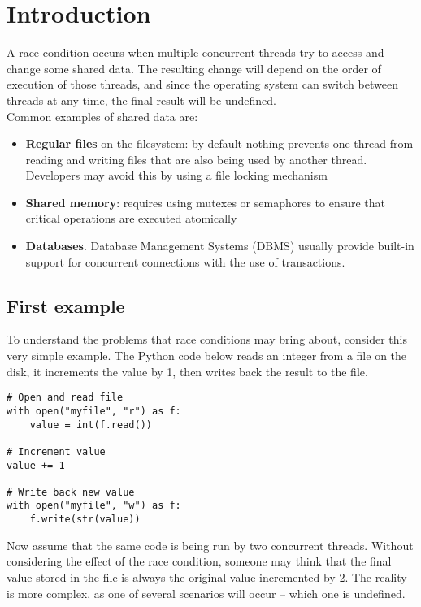 \section{Introduction}

A race condition occurs when multiple concurrent threads try to access and change some shared data. The resulting change will depend on the order of execution of those threads, and since the operating system can switch between threads at any time, the final result will be undefined.\\

Common examples of shared data are:
\begin{itemize}
  \item \textbf{Regular files} on the filesystem: by default nothing prevents one thread from reading and writing files that are also being used by another thread. Developers may avoid this by using a file locking mechanism
  \item \textbf{Shared memory}: requires using mutexes or semaphores to ensure that critical operations are executed atomically
  \item \textbf{Databases}. Database Management Systems (DBMS) usually provide built-in support for concurrent connections with the use of transactions.
\end{itemize}

\subsection{First example}

To understand the problems that race conditions may bring about, consider this very simple example. The Python code below reads an integer from a file on the disk, it increments the value by 1, then writes back the result to the file.

\begin{verbatim}
# Open and read file
with open("myfile", "r") as f:
    value = int(f.read())

# Increment value
value += 1

# Write back new value
with open("myfile", "w") as f:
    f.write(str(value))
\end{verbatim}

Now assume that the same code is being run by two concurrent threads. Without considering the effect of the race condition, someone may think that the final value stored in the file is always the original value incremented by 2. The reality is more complex, as one of several scenarios will occur -- which one is undefined.

